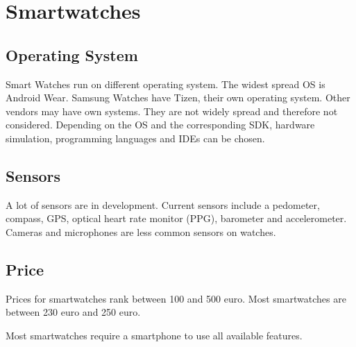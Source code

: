 \section{Smartwatches}

\subsection{Operating System}
Smart Watches run on different operating system. The widest spread OS is Android Wear. Samsung Watches have Tizen, their own operating system.
Other vendors may have own systems. They are not widely spread and therefore not considered. Depending on the OS and the corresponding SDK, hardware simulation, programming languages and IDEs can be chosen. 

\subsection{Sensors}
A lot of sensors are in development. Current sensors include a pedometer, compass, GPS, optical heart rate monitor (PPG), barometer  and accelerometer. Cameras and microphones are less common sensors on watches.

\subsection{Price}
Prices for smartwatches rank between 100 and 500 euro. Most smartwatches are  between 230 euro and 250 euro.

Most smartwatches require a smartphone to use all available features. 

